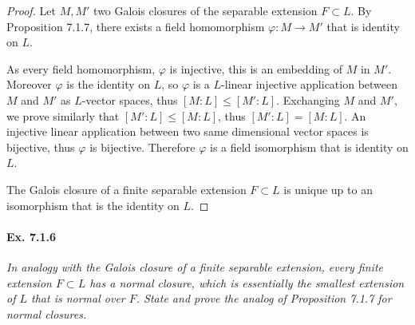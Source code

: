 \documentclass[11pt,a4paper]{article}
\begin{document}
\begin{proof}
Let $M,M'$ two Galois closures of the separable extension $F \subset L$.
By Proposition 7.1.7, there exists a field homomorphism  $\varphi : M\to M'$ that is identity on $L$.

As every field homomorphism, $\varphi$ is injective, this is an embedding of $M$ in $M'$. Moreover $\varphi$ is the identity on $L$, so $\varphi$ is a $L$-linear injective application between  $M$ and $M'$ as $L$-vector spaces, thus $[M:L] \leq [M':L]$. Exchanging $M$ and $M'$, we prove similarly that $[M':L] \leq [M:L]$, thus $[M':L] = [M:L]$. An injective linear application between two same dimensional vector spaces is bijective, thus $\varphi$ is bijective. Therefore $\varphi$ is a field isomorphism that is identity on $L$.

The Galois closure of a finite separable extension $F \subset L$ is unique up to an isomorphism that is the identity on $L$.
\end{proof}

\paragraph{Ex. 7.1.6}

{\it In analogy with the Galois closure of a finite separable extension, every finite extension $F \subset L$ has a normal closure, which is essentially the smallest extension of $L$ that is normal over $F$. State and prove the analog of Proposition 7.1.7 for normal closures.
}

\bigskip
\end{document}

